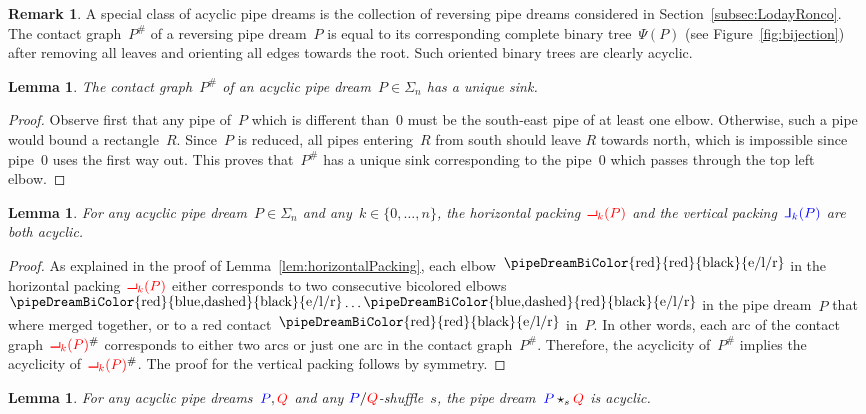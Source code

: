 \documentclass{amsart}
\newtheorem{lemma}[theorem]{Lemma}
\theoremstyle{definition}
\newtheorem{remark}[theorem]{Remark}
\renewcommand{\b}[1]{{\color{blue} #1}} %
\renewcommand{\r}[1]{{\color{red} #1}} %
\newcommand{\elbowBiColor}[2]{\raisebox{.1cm}{\pipeDreamBiColor{#1}{#2}{black}{e/l/r}}}
\newcommand{\lrot}{\rotatebox{90}{$\mathsf{L}$}}
\newcommand{\lmir}{\reflectbox{$\mathsf{L}$}}
\newcommand{\contact}{^\#} %
\newcommand{\acyclicPipeDreams}{\Sigma} %
\begin{document}
\begin{remark}
A special class of acyclic pipe dreams is the collection of reversing pipe dreams considered in Section~\ref{subsec:LodayRonco}. 
The contact graph~$P\contact$ of a reversing pipe dream~$P$ is equal to its corresponding complete binary tree~$\Psi(P)$ (see Figure~\ref{fig:bijection}) after removing all leaves and orienting all edges towards the root.
Such oriented binary trees are clearly acyclic.
\end{remark}

\begin{lemma}
\label{lem:singleSource}
The contact graph~$P\contact$ of an acyclic pipe dream~$P \in \acyclicPipeDreams_n$ has a unique sink.
\end{lemma}

\begin{proof}
Observe first that any pipe of~$P$ which is different than~$0$ must be the south-east pipe of at least one elbow.
Otherwise, such a pipe would bound a rectangle~$R$.
Since~$P$ is reduced, all pipes entering~$R$ from south should leave $R$ towards north, which is impossible since pipe~$0$ uses the first way out.
This proves that~$P\contact$ has a unique sink corresponding to the pipe~$0$ which passes through the top left elbow.
\end{proof}

\begin{lemma}
\label{lem:packingAcyclic}
For any acyclic pipe dream~$P \in \acyclicPipeDreams_n$ and any~$k \in \{0, \dots, n\}$, the horizontal packing~$\r{\lrot_k(P)}$ and the vertical packing~$\b{\lmir_k(P)}$ are both acyclic.
\end{lemma}

\begin{proof}
As explained in the proof of Lemma~\ref{lem:horizontalPacking}, each elbow~$\elbowBiColor{red}{red}$ in the horizontal packing~$\r{\lrot_k(P)}$ either corresponds to two consecutive bicolored elbows~$\elbowBiColor{red}{blue,dashed} \cdots \elbowBiColor{blue,dashed}{red}$ in the pipe dream~$P$ that where merged together, or to a red contact~$\elbowBiColor{red}{red}$ in~$P$. In other words, each arc of the contact graph~$\r{\lrot_k(P)}\contact$ corresponds to either two arcs or just one arc in the contact graph~$P\contact$. Therefore, the acyclicity of~$P\contact$ implies the acyclicity of~$\r{\lrot_k(P)}\contact$. The proof for the vertical packing follows by symmetry.
\end{proof}

\begin{lemma}
\label{lem:starAcyclic}
For any acyclic pipe dreams~$\b{P}, \r{Q}$ and any $\b{P}/\r{Q}$-shuffle~$s$, the pipe dream~$\b{P} \star_{s} \r{Q}$ is acyclic.
\end{lemma}
\end{document}
